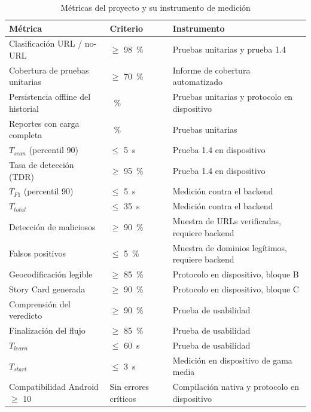 \begin{table}[H]
    \centering
    \caption{Métricas del proyecto y su instrumento de medición}
    \begin{tabular}{@{}>{\raggedright\arraybackslash}p{4.3cm}>{\raggedright\arraybackslash}p{2.3cm}>{\raggedright\arraybackslash}p{5.0cm}@{}}
        \toprule
        \textbf{Métrica} & \textbf{Criterio} & \textbf{Instrumento} \\
        \midrule
        Clasificación URL / no-URL & $\geq$ 98~\% & Pruebas unitarias y prueba 1.4 \\
        Cobertura de pruebas unitarias & $\geq$ 70~\% & Informe de cobertura automatizado \\
        Persistencia offline del historial & 100~\% & Pruebas unitarias y protocolo en dispositivo \\
        Reportes con carga completa & 100~\% & Pruebas unitarias \\
        \(T_{scan}\) (percentil 90) & $\leq$ 5~s & Prueba 1.4 en dispositivo \\
        Tasa de detección (TDR) & $\geq$ 95~\% & Prueba 1.4 en dispositivo \\
        \(T_{F1}\) (percentil 90) & $\leq$ 5~s & Medición contra el backend \\
        \(T_{total}\) & $\leq$ 35~s & Medición contra el backend \\
        Detección de maliciosos & $\geq$ 90~\% & Muestra de URLs verificadas, requiere backend \\
        Falsos positivos & $\leq$ 5~\% & Muestra de dominios legítimos, requiere backend \\
        Geocodificación legible & $\geq$ 85~\% & Protocolo en dispositivo, bloque B \\
        Story Card generada & $\geq$ 90~\% & Protocolo en dispositivo, bloque C \\
        Comprensión del veredicto & $\geq$ 90~\% & Prueba de usabilidad \\
        Finalización del flujo & $\geq$ 85~\% & Prueba de usabilidad \\
        \(T_{learn}\) & $\leq$ 60~s & Prueba de usabilidad \\
        \(T_{start}\) & $\leq$ 3~s & Medición en dispositivo de gama media \\
        Compatibilidad Android $\geq$ 10 & Sin errores críticos & Compilación nativa y protocolo en dispositivo \\
        \bottomrule
    \end{tabular}
    \label{tab:metricas}
\end{table}

